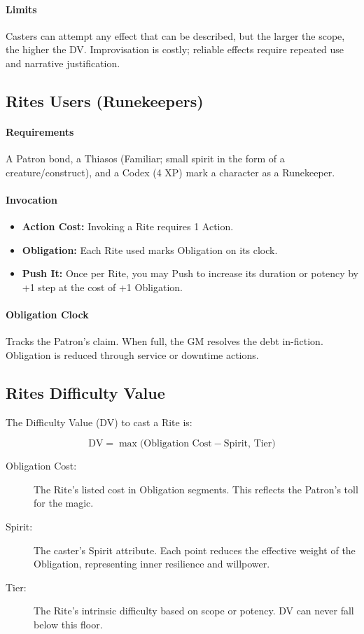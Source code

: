 \paragraph{Limits}
Casters can attempt any effect that can be described, but the larger the scope, the higher the DV. Improvisation is costly; reliable effects require repeated use and narrative justification.

\subsection{Rites Users (Runekeepers)}
\paragraph{Requirements}
A Patron bond, a Thiasos (Familiar; small spirit in the form of a creature/construct), and a Codex (4 XP) mark a character as a Runekeeper. 

\paragraph{Invocation}
\begin{itemize}
  \item \textbf{Action Cost:} Invoking a Rite requires 1 Action. 
  \item \textbf{Obligation:} Each Rite used marks Obligation on its clock. 
  \item \textbf{Push It:} Once per Rite, you may Push to increase its duration or potency by +1 step at the cost of +1 Obligation.
\end{itemize}

\paragraph{Obligation Clock}
Tracks the Patron’s claim. When full, the GM resolves the debt in-fiction. Obligation is reduced through service or downtime actions.

\subsection{Rites Difficulty Value}
\label{sec:rites-dv-expanded}

The Difficulty Value (DV) to cast a Rite is:

\[
\text{DV} = \max\!\big(\text{Obligation Cost} - \text{Spirit}, \, \text{Tier}\big)
\]

\begin{description}
  \item[Obligation Cost:] The Rite’s listed cost in Obligation segments. This reflects the Patron’s toll for the magic.
  \item[Spirit:] The caster’s Spirit attribute. Each point reduces the effective weight of the Obligation, representing inner resilience and willpower.
  \item[Tier:] The Rite’s intrinsic difficulty based on scope or potency. DV can never fall below this floor.
\end{description}

